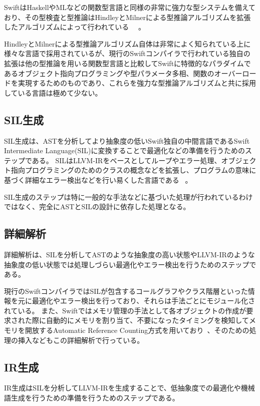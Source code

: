 SwiftはHaskellやMLなどの関数型言語と同様の非常に強力な型システムを備えており、その型検査と型推論はHindleyとMilnerによる型推論アルゴリズムを拡張したアルゴリズムによって行われている~\cite{swift-type-checker} ~\cite{tapl}。

HindleyとMilnerによる型推論アルゴリズム自体は非常によく知られている上に様々な言語で採用されているが、現行のSwiftコンパイラで行われている独自の拡張は他の型推論を用いる関数型言語と比較してSwiftに特徴的なパラダイムであるオブジェクト指向プログラミングや型パラメータ多相、関数のオーバーロードを実現するためのものであり、これらを強力な型推論アルゴリズムと共に採用している言語は極めて少ない。

\subsection{SIL生成}

SIL生成は、ASTを分析してより抽象度の低いSwift独自の中間言語であるSwift Intermediate Language(SIL)に変換することで最適化などの準備を行うためのステップである。
SILはLLVM-IRをベースとしてループやエラー処理、オブジェクト指向プログラミングのためのクラスの概念などを拡張し、プログラムの意味に基づく詳細なエラー検出などを行い易くした言語である ~\cite{sil}。

SIL生成のステップは特に一般的な手法などに基づいた処理が行われているわけではなく、完全にASTとSILの設計に依存した処理となる。

\subsection{詳細解析}
\label{refinement:structure:analyze}

詳細解析は、SILを分析してASTのような抽象度の高い状態やLLVM-IRのような抽象度の低い状態では処理しづらい最適化やエラー検出を行うためのステップである。

現行のSwiftコンパイラではSILが包含するコールグラフやクラス階層といった情報を元に最適化やエラー検出を行っており、それらは手法ごとにモジュール化されている。
また、Swiftではメモリ管理の手法として各オブジェクトの作成が要求された際に自動的にメモリを割り当て、不要になったタイミングを検知してメモリを開放するAutomatic Reference Counting方式を用いており~\cite{arc}、そのための処理の挿入などもこの詳細解析で行っている。

\subsection{IR生成}

IR生成はSILを分析してLLVM-IRを生成することで、低抽象度での最適化や機械語生成を行うための準備を行うためのステップである。

